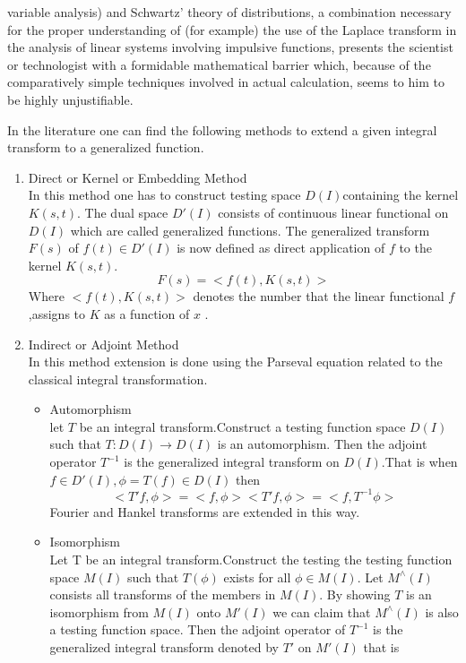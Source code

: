 \begin{large}
\begin{itemize}
variable analysis) and Schwartz' theory of distributions, a combination necessary for the
proper understanding of (for example) the use of the Laplace transform in the analysis of linear systems involving impulsive functions, presents the scientist or technologist with a formidable mathematical barrier which, because of the comparatively simple techniques involved in actual calculation, seems to him to be highly unjustifiable.\cite{H. GRAHAM FLEGG}
\end{itemize}

In the literature one can find the following methods to extend a given integral transform to a generalized function.
\begin{enumerate}
\item Direct or Kernel or Embedding Method\\
In this method one has to construct testing space $D(I)$containing the kernel $K(s, t)$. The dual space $D'(I)$ consists of continuous linear functional on $D(I)$ which are called generalized functions. The generalized transform $F(s)$ of $ f(t)\in D'(I) $ is now defined as direct application of $f$ to the kernel $K(s, t)$.\\
\begin{equation}
 F(s)=<f(t),K(s,t)>
 \end{equation}
 Where $<f(t),K(s,t)>$ denotes the number that the linear functional $f$,assigns to $K$ as a
function of $x$ .
\item Indirect or Adjoint Method\\
In this method extension is done using the Parseval equation related to the classical
integral transformation.
\begin{itemize}
\item Automorphism\\
 let $T$ be an integral transform.Construct a testing function space $D(I)$  such that $T :D(I)\rightarrow D(I) $ is an automorphism. Then the adjoint operator $T^{-1}$ is the generalized integral transform on $D(I)$.That is when $f \in D'(I) ,\phi=T(f)\in D(I)$ then
\begin{equation*}
<T'f,\phi> = <f,\phi>
<T'f,\phi> = <f,T^{-1}\phi>
\end{equation*}
Fourier and Hankel transforms are extended in this way.
\item Isomorphism \\
Let T be an integral transform.Construct the testing the testing function space $M(I)$ such that $T(\phi)$ exists for all $\phi\in M(I)$. Let $M^{\wedge}(I)$ consists all transforms of the members in $M(I)$. By showing $T$ is an isomorphism from $M(I)$ onto $M'(I)$ we can claim that $M^{\wedge}(I)$ is also a testing function space. Then the adjoint operator of $T^{-1}$ is the generalized integral transform denoted by $T'$ on $M'(I)$ that is

\end{itemize}
\end{enumerate}
\end{large}
